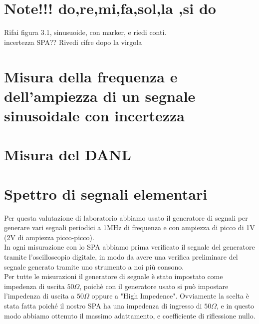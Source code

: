 \documentclass[11pt,a4paper,oneside]{book}
\begin{document}


\frontmatter 
\tableofcontents

\mainmatter
 \chapter{Note!!! do,re,mi,fa,sol,la ,si do}
Rifai figura 3.1, sinusuoide, con marker, e riedi conti. 
\\incertezza SPA?? Rivedi cifre dopo la virgola
\chapter{Misura della frequenza e dell'ampiezza di un segnale sinusoidale con incertezza}

\chapter{Misura del DANL}

\chapter{Spettro di segnali elementari}
Per questa valutazione di laboratorio abbiamo usato il generatore di segnali per generare vari 
segnali periodici a 1MHz di frequenza e con ampiezza di picco di 1V (2V di ampiezza picco-picco).
\\In ogni misurazione con lo SPA abbiamo prima verificato il segnale del generatore tramite
 l'oscilloscopio digitale, in modo da avere una verifica preliminare del segnale generato
 tramite uno strumento a noi più consono. 
\\Per tutte le misurazioni il generatore di segnale è stato impostato come impedenza di
 uscita $50\Omega$, poichè con il generatore usato si può impostare l'impedenza di uscita a
 $50\Omega$ oppure a "High Impedence". Ovviamente la scelta è stata fatta poiché il nostro SPA ha
una impedenza di ingresso di $50\Omega$, e in questo modo abbiamo ottenuto il massimo
 adattamento, e coefficiente di riflessione nullo.
\end{document}

